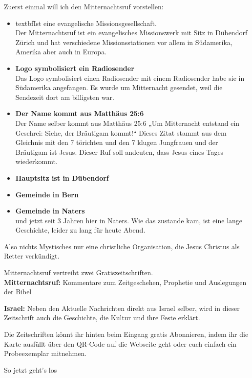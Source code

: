 \documentclass[fontsize=16pt]{mybib}
\begin{document}
\begin{otsblock}
    Zuerst einmal will ich den Mitternachtsruf vorstellen:
    \begin{itemize}
        \item textbf{Ist eine evangelische Missionsgesellschaft.}\\
        Der Mitternachtsruf ist ein evangelisches Missionswerk mit Sitz in Dübendorf Zürich und hat verschiedene Missionsstationen vor allem in Südamerika, Amerika aber auch in Europa.
        \item \textbf{Logo symbolisiert ein Radiosender}\\
        Das Logo symbolisiert einen Radiosender mit einem Radiosender habe sie in Südamerika angefangen. Es wurde um Mitternacht gesendet, weil die Sendezeit dort am billigsten war.        
        \item \textbf{Der Name kommt aus Matthäus 25:6} \\
        Der Name selber kommt aus Matthäus 25:6 „Um Mitternacht entstand ein Geschrei: Siehe, der Bräutigam kommt!“ Dieses Zitat stammt aus dem Gleichnis mit den 7 törichten und den 7 klugen Jungfrauen und der Bräutigam ist Jesus. Dieser Ruf soll andeuten, dass Jesus eines Tages wiederkommt.
        \item \textbf{Hauptsitz ist in Dübendorf}
        \item \textbf{Gemeinde in Bern}
        \item \textbf{Gemeinde in Naters}\\
        und jetzt seit 3 Jahren hier in Naters. Wie das zustande kam, ist eine lange Geschichte, leider zu lang für heute Abend.
    \end{itemize}
    Also nichts Mystisches nur eine christliche Organisation, die Jesus Christus als Retter verkündigt.
\end{otsblock}
\begin{otsblock}
    Mitternachtsruf vertreibt zwei Gratiszeitschriften.\\
    \textbf{Mitternachtsruf:} Kommentare zum Zeitgeschehen, Prophetie und Auslegungen der Bibel

    \textbf{Israel:} Neben den Aktuelle Nachrichten direkt aus Israel selber, wird in dieser Zeitschrift auch die Geschichte, die Kultur und ihre Feste erklärt.

    Die Zeitschriften könnt ihr hinten beim Eingang gratis Abonnieren, indem ihr die Karte ausfüllt über den QR-Code auf die Webseite geht oder euch einfach ein Probeexemplar mitnehmen.

So jetzt geht’s los
\end{otsblock}
\end{document}
